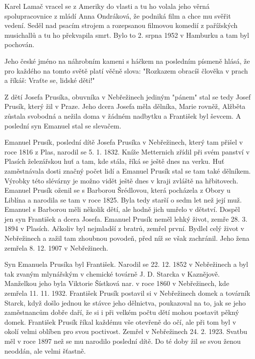 \documentclass[../dejiny-rodu-prusiku.tex]{subfiles}
\begin{document}
Karel Lamač vracel se z Ameriky do vlasti a tu ho volala jeho věrná spolupracovnice z mládí Anna Ondráková, že podniká film a chce mu svěřit vedení. Seděl nad psacím strojem a rozepsanou filmovou komedií z pařížských musichallů a tu ho překvapila smrt. Bylo to 2. srpna 1952 v Hamburku a tam byl pochován.

Jeho české jméno na náhrobním kameni s háčkem na posled­ním písmeně hlásá, že pro každého na tomto světě platí věčně slova: "Rozkazem obracíš člověka v prach a říkáš: Vraťte se, lidské děti!"

Z dětí Josefa Prusíka, obuvníka v Nebřežinech jediným "pánem" stal se tedy Josef Prusík, který žil v Praze. Jeho dcera Josefa měla dělníka, Marie rovněž, Alžběta zůstala svobodná a nežila doma v žádném nadbytku a František byl ševcem. A poslední syn Emanuel stal se slevačem.

Emanuel Prusík, poslední dítě Josefa Prusíka v Nebřežinech, který tam přišel v roce 1816 z Plas, narodil se 5. 1. 1832. Kníže Metternich zřídil při svém panství v Plasích železářskou huť a tam, kde stála, říká se ještě dnes na verku. Huť zaměstnávala dosti značný počet lidí a Emanuel Prusík stal se tam také dělníkem. Výrobky této slévárny je možno vidět ještě dnes v kraji zvláště na hřbitovech. Emanuel Prusík oženil se s Barborou Šrédlovou, která pocházela z Obory u Liblína a narodi­la se tam v roce 1825. Byla tedy starší o sedm let než její muž. Emanuel s Barborou měli několik dětí, ale hodně jich umřelo v dětství. Dospěl jen syn František a dcera Josefa. Emanuel Prusík neměl lehký život, zemře 28. 3. 1894 v Plasích. Ačkoliv byl nejmladší z bratrů, zemřel první. Bydlel celý život v Nebřežinech a zažil tam zhoubnou povodeň, před níž se však zachránil. Jeho žena zemřela 8. 12. 1907 v Nebřežinech.

Syn Emanuela Prusíka byl František. Narodil se 22. 12. 1852 v Nebřežinech a byl tak zvaným mlynářským v chemické továrně J. D. Starcka v Kaznějově. Manželkou jeho byla Viktorie Šístková nar. v roce 1860 v Nebřežinech, kde zemřela 11. 11. 1932. František Prusík postavil si v Nebřežinech domek a továrník Starck, když došlo jednou ke stávce jeho dělnictva, poukazoval na to, jak se jeho zaměstnancům dobře daří, že si i při velkém počtu dětí mohou postavit pěkný domek. František Prusík říkal kaž­dému vše otevřeně do očí, ale při tom byl v okolí velmi oblíben pro svou poctivost. Zemřel v Nebřežinech 24. 2. 1923. Svatbu měl v roce 1897 než se mu narodilo poslední dítě. Do té doby žil se svou ženou neoddán, ale velmi šťastně.
\end{document}
